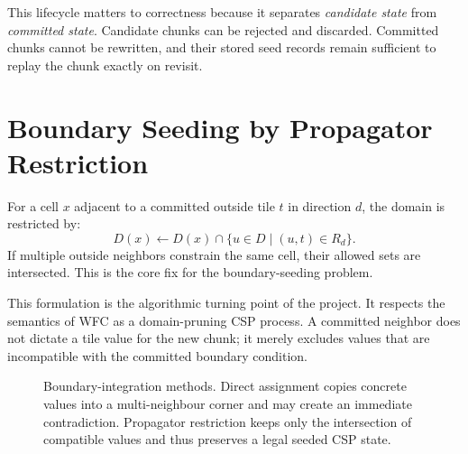 \documentclass[12pt,a4paper]{report}
\begin{document}
This lifecycle matters to correctness because it separates \emph{candidate state} from \emph{committed state}. Candidate chunks can be rejected and discarded. Committed chunks cannot be rewritten, and their stored seed records remain sufficient to replay the chunk exactly on revisit.

\section{Boundary Seeding by Propagator Restriction}
For a cell $x$ adjacent to a committed outside tile $t$ in direction $d$, the domain is restricted by:
\[
D(x) \leftarrow D(x) \cap \{u \in D \mid (u,t)\in R_d\}.
\]
If multiple outside neighbors constrain the same cell, their allowed sets are intersected. This is the core fix for the boundary-seeding problem.

This formulation is the algorithmic turning point of the project. It respects the semantics of WFC as a domain-pruning CSP process. A committed neighbor does not dictate a tile value for the new chunk; it merely excludes values that are incompatible with the committed boundary condition.

\begin{figure}[H]
\centering
{}
\caption{Boundary-integration methods. Direct assignment copies concrete values into a multi-neighbour corner and may create an immediate contradiction. Propagator restriction keeps only the intersection of compatible values and thus preserves a legal seeded CSP state.}
\label{fig:boundary-methods}
\end{figure}
\end{document}
